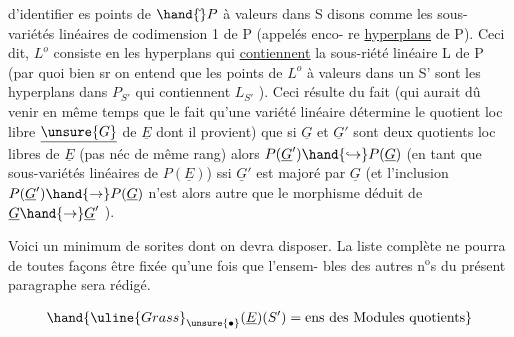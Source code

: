  

 d'identifier es points de $\hand{\check{}}P$\hand{,} à valeurs dans  S disons\hand{,}
comme les sous-variétés linéaires de codimension 1 de P (appelés enco-%
re \uline{hyperplans} de P). Ceci dit, $L^{o}$ consiste en les hyperplans qui
\uline{contiennent} la sous-riété linéaire L de P (par quoi bien sr on
entend que les points de $L^{o}$  à valeurs dans un S' sont les
hyperplans dans $P_{S'}$ qui contiennent $L_{S'}$ ). Ceci résulte du fait 
\margin{|}(qui aurait dû venir en même temps que le fait qu'une variété linéaire \hand{,}
détermine le quotient loc libre $\underline{\unsure{G}}$ de $\underline{E}$ dont il provient) que si
$\underline{G}$ et $\underline{G}'$ sont deux quotients loc libres de $\underline{E}$ (pas néc de même rang)
alors $P(\underline{G}')\hand{\hookrightarrow}P(\underline{G})$ (en tant que sous-variétés linéaires de $P(\underline{E})$) ssi
$\underline{G}'$ est majoré par $\underline{G}$ (et l'inclusion $P(\underline{G}')\hand{\rightarrow}P(\underline{G})$ n'est alors autre
que le morphisme déduit de $\underline{G}\hand{\rightarrow}\underline{G}'$ ).

Voici un minimum de sorites dont on devra disposer. La liste
complète ne pourra de toutes façons être fixée qu'une fois que l'ensem-%
bles des autres n$^{\text{o}}$s du présent paragraphe sera rédigé.


\[ \hand{\uline{Grass}_{\unsure{\bullet}}(\underline{E})(S') = \text{ens des Modules quotients}} \]

\hand{sections de \uline{Grass}$_{\unsure{*}}(\underline{E})$ sur S [NB. le}

